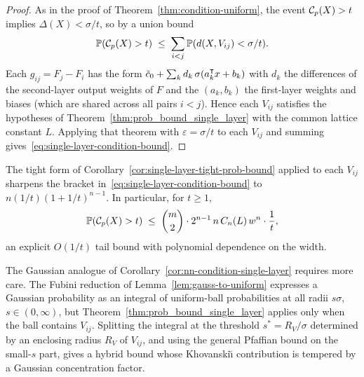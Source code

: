 \begin{proof}
  As in the proof of Theorem~\ref{thm:condition-uniform}, the event $\mathcal{C}_p(X)>t$ implies $\Delta(X) < \sigma/t$, so by a union bound
  \begin{equation*}
    \mathbb{P}(\mathcal{C}_p(X)>t) \;\leq\; \sum_{i<j}\mathbb{P}(d(X,V_{ij})<\sigma/t).
  \end{equation*}
  Each $g_{ij}=F_j-F_i$ has the form $\tilde c_0+\sum_k d_k\,\sigma(a_k^{\intercal}x+b_k)$ with $d_k$ the differences of the second-layer output weights of $F$ and the $(a_k,b_k)$ the first-layer weights and biases (which are shared across all pairs $i<j$). Hence each $V_{ij}$ satisfies the hypotheses of Theorem~\ref{thm:prob_bound_single_layer} with the common lattice constant $L$. Applying that theorem with $\varepsilon=\sigma/t$ to each $V_{ij}$ and summing gives~\eqref{eq:single-layer-condition-bound}.
\end{proof}

\begin{remark}\label{rem:single-layer-condition-tight}
  The tight form of Corollary~\ref{cor:single-layer-tight-prob-bound} applied to each $V_{ij}$ sharpens the bracket in~\eqref{eq:single-layer-condition-bound} to $n(1/t)(1+1/t)^{n-1}$. In particular, for $t\geq 1$,
  \begin{equation*}
    \mathbb{P}(\mathcal{C}_p(X)>t) \;\leq\; \binom{m}{2}\cdot 2^{n-1}\,n\,C_n(L)\,w^n\cdot\frac{1}{t},
  \end{equation*}
  an explicit $O(1/t)$ tail bound with polynomial dependence on the width.
\end{remark}

The Gaussian analogue of Corollary~\ref{cor:nn-condition-single-layer} requires more care. The Fubini reduction of Lemma~\ref{lem:gauss-to-uniform} expresses a Gaussian probability as an integral of uniform-ball probabilities at all radii $s\sigma$, $s \in (0,\infty)$, but Theorem~\ref{thm:prob_bound_single_layer} applies only when the ball contains $V_{ij}$. Splitting the integral at the threshold $s^* = R_V/\sigma$ determined by an enclosing radius $R_V$ of $V_{ij}$, and using the general Pfaffian bound on the small-$s$ part, gives a hybrid bound whose Khovanski\u\i{} contribution is tempered by a Gaussian concentration factor.

